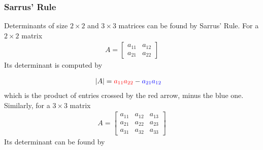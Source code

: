\subsubsection{Sarrus' Rule}
\begin{proper}
\label{proper:sarrus}
Determinants of size $2 \times 2$ and $3 \times 3$ matrices can be found by Sarrus' Rule. For a $2 \times 2$ matrix
\begin{align*}
A =
\begin{bmatrix}
a_{11} & a_{12} \\
a_{21} & a_{22}
\end{bmatrix} 
\end{align*}
Its determinant is computed by
\vspace{-5pt}
\begin{center}
\end{center}
\vspace{-25pt}
\begin{align}
\abs{A} &= \textcolor{red}{a_{11}a_{22}} - \textcolor{blue}{a_{21}a_{12}}
\end{align}
which is the product of entries crossed by the red arrow, minus the blue one. Similarly, for a $3 \times 3$ matrix
\begin{align*}
A =
\begin{bmatrix}
a_{11} & a_{12} & a_{13} \\
a_{21} & a_{22} & a_{23} \\
a_{31} & a_{32} & a_{33}
\end{bmatrix} 
\end{align*}
Its determinant can be found by
\vspace{-5pt}
\begin{center}
\begin{tikzpicture}

\end{tikzpicture}
\end{center}
\end{proper}
